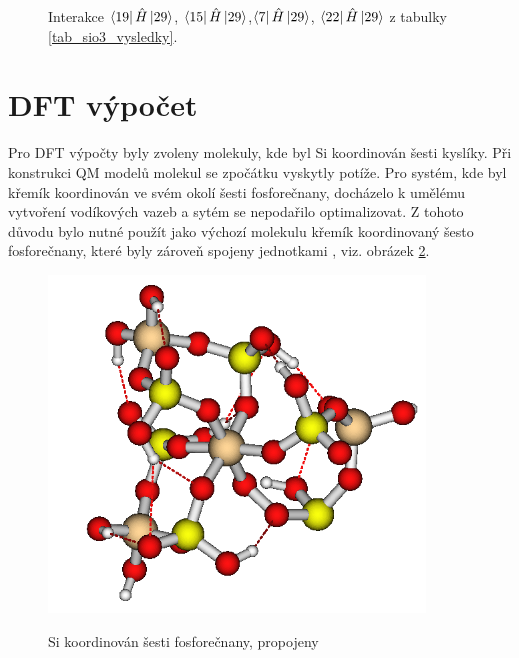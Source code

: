 \documentclass[
  digital, %
  table,   %
  lof,     %
  lot,     %
]{fithesis3}
\begin{document}
\begin{figure}
\begin{center}
{\label{obr_sio3_MO_35}}
\caption{Interakce $\bra{19}{\hat{H}}\ket{29}$, $\bra{15}{\hat{H}}\ket{29}$,$\bra{7}{\hat{H}}\ket{29}$, $\bra{22}{\hat{H}}\ket{29}$ z tabulky \ref{tab_sio3_vysledky}.}

\label{obr_sio3p_vysledky_I}\end{center}
\end{figure} 
  
\section{DFT výpočet} 
Pro DFT výpočty byly zvoleny molekuly, kde byl Si koordinován šesti kyslíky. Při konstrukci QM modelů molekul se zpočátku vyskytly potíže. Pro systém, kde byl křemík koordinován ve svém okolí šesti fosforečnany, docházelo k umělému vytvoření vodíkových vazeb a sytém se nepodařilo optimalizovat. Z tohoto důvodu bylo nutné použít jako výchozí molekulu křemík koordinovaný šesto fosforečnany, které byly zároveň spojeny jednotkami , viz. obrázek \ref{obr_si_o_poh3_6_propojeno_si}.

\begin{figure}[h]
\caption{Si koordinován šesti fosforečnany, propojeny  }
  \center
  \includegraphics[width=10cm]{obr_si_o_poh3_6_propojeno_si.png}
  \label{obr_si_o_poh3_6_propojeno_si}
  \end{figure}
\end{document}
